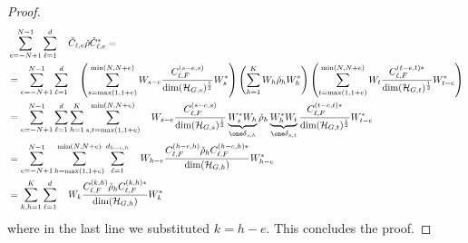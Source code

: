 \documentclass[aihp,12pt]{imsart}
\begin{document}
\begin{proof}
\begin{align*}
    &\sum_{e=-N+1}^{N-1} \sum_{\ell=1}^d\quad \check{C}_{\ell,e} \check{\rho} {\check{C}_{\ell,e}}^* = \\
    & = \sum_{e=-N+1}^{N-1} \sum_{\ell=1}^d\quad \left( \sum_{s=\max(1,1+e)}^{\min(N,N+e)} W_{s-e} \frac{C_{\ell,F}^{(s-e,s)}}{\dim(\Hc_{G,s})^\um} W_s^*\right) \left( \sum_{h=1}^K W_h \check{\rho}_h W_h^*\right) \left( \sum_{t=\max(1,1+e)}^{\min(N,N+e)} W_t \frac{C_{\ell,F}^{(t-e,t)*}}{\dim(\Hc_{G,t})^\um} W_{t-e}^*\right)\\
    &= \sum_{e=-N+1}^{N-1} \sum_{\ell=1}^d \sum_{h=1}^K \sum_{s,t=\max(1,1+e)}^{\min(N,N+e)}  \quad W_{s-e} \frac{C_{\ell,F}^{(s-e,s)}}{\dim(\Hc_{G,s})^\um} \underbrace{W_s^* W_h}_{\one \delta_{s,h}} \check{\rho}_h \underbrace{W_h^* W_t}_{\one \delta_{s,t}} \frac{C_{\ell,F}^{(t-e,t)*}}{\dim(\Hc_{G,t})^\um} W_{t-e}^*\\
    &= \sum_{e=-N+1}^{N-1} \sum_{h=\max(1,1+e)}^{\min(N,N+e)} \sum_{\ell=1}^{d_{h-e,h}}\quad W_{h-e} \frac{C_{\ell,F}^{(h-e,h)} \check{\rho}_h C_{\ell,F}^{(h-e,h)*}}{\dim(\Hc_{G,h})} W_{h-e}^*\\
    &= \sum_{k,h=1}^K \sum_{\ell=1}^{d}\quad W_k \frac{C_{\ell,F}^{(k,h)} \check{\rho}_h C_{\ell,F}^{(k,h)*}}{\dim(\Hc_{G,h})} W_k^* 
\end{align*}
where in the last line we substituted $k=h-e$. This concludes the proof.
\end{proof}
\end{document}
